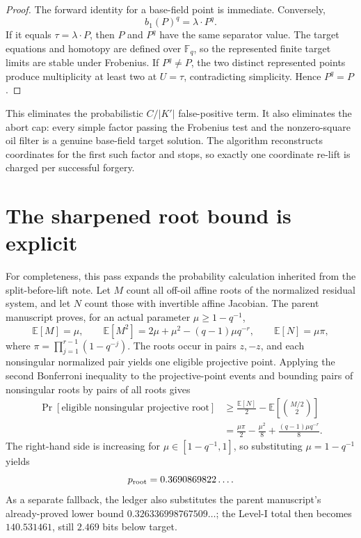 \documentclass[11pt,a4paper]{article}
\theoremstyle{definition}
\theoremstyle{remark}
\newcommand{\F}{\mathbb F}
\begin{document}
\begin{proof}
The forward identity for a base-field point is immediate.  Conversely,
\[
 b_1(P)^q
 =\lambda\cdot P^q.
\]
If it equals $\tau=\lambda\cdot P$, then $P$ and $P^q$ have the same separator value.  The target equations and homotopy are defined over $\F_q$, so the represented finite target limits are stable under Frobenius.  If $P^q\ne P$, the two distinct represented points produce multiplicity at least two at $U=\tau$, contradicting simplicity.  Hence $P^q=P$.
\end{proof}

This eliminates the probabilistic $C/|K'|$ false-positive term.  It also eliminates the abort cap: every simple factor passing the Frobenius test and the nonzero-square oil filter is a genuine base-field target solution.  The algorithm reconstructs coordinates for the first such factor and stops, so exactly one coordinate re-lift is charged per successful forgery.

\section{The sharpened root bound is explicit}\label{sec:rootbound}

For completeness, this pass expands the probability calculation inherited from the split-before-lift note.  Let $M$ count all off-oil affine roots of the normalized residual system, and let $N$ count those with invertible affine Jacobian.  The parent manuscript proves, for an actual parameter $\mu\ge 1-q^{-1}$,
\[
 \mathbb E[M]=\mu,
 \qquad
 \mathbb E[M^2]=2\mu+\mu^2-(q-1)\mu q^{-r},
 \qquad
 \mathbb E[N]=\mu\pi,
\]
where $\pi=\prod_{j=1}^{r-1}(1-q^{-j})$.  The roots occur in pairs $z,-z$, and each nonsingular normalized pair yields one eligible projective point.  Applying the second Bonferroni inequality to the projective-point events and bounding pairs of nonsingular roots by pairs of all roots gives
\begin{align*}
 \Pr[\text{eligible nonsingular projective root}]
 &\ge \frac{\mathbb E[N]}2
      -\mathbb E\!\left[\binom{M/2}{2}\right]\\
 &=\frac{\mu\pi}{2}-\frac{\mu^2}{8}
   +\frac{(q-1)\mu q^{-r}}8.
\end{align*}
The right-hand side is increasing for $\mu\in[1-q^{-1},1]$, so substituting $\mu=1-q^{-1}$ yields
\[
 p_{\rm root}=0.3690869822\ldots.
\]
As a separate fallback, the ledger also substitutes the parent manuscript's already-proved lower bound $0.326336998767509\ldots$; the Level-I total then becomes $140.531461$, still $2.469$ bits below target.
\end{document}
